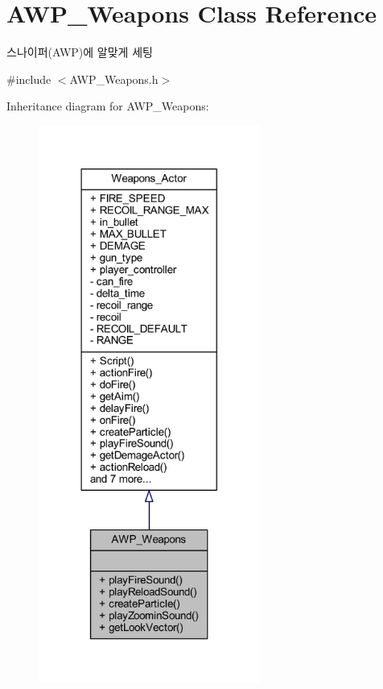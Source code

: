 \hypertarget{class_a_w_p___weapons}{}\section{A\+W\+P\+\_\+\+Weapons Class Reference}
\label{class_a_w_p___weapons}


스나이퍼(\+A\+W\+P)에 알맞게 세팅  




{\ttfamily \#include $<$A\+W\+P\+\_\+\+Weapons.\+h$>$}



Inheritance diagram for A\+W\+P\+\_\+\+Weapons\+:\nopagebreak
\begin{figure}[H]
\begin{center}
\leavevmode
\includegraphics[width=206pt]{class_a_w_p___weapons__inherit__graph}
\end{center}
\end{figure}


